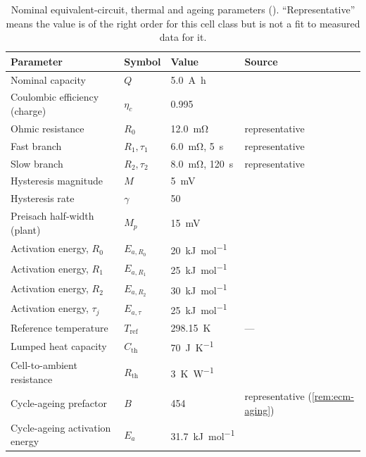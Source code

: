 \begin{table}[H]\centering
\caption{Nominal equivalent-circuit, thermal and ageing parameters
(). ``Representative'' means the value is of the right order for this
cell class but is not a fit to measured data for it.}
\label{tab:ecm-cellparams}
\small
\begin{tabular}{llll}\toprule
Parameter & Symbol & Value & Source \\ \midrule
Nominal capacity & $Q$ & \SI{5.0}{\ampere\hour} & \cite{chen2020parameterization}\\
Coulombic efficiency (charge) & $\eta_c$ & \num{0.995} & \cite{ng2009coulomb,smith2010coulombic}\\
Ohmic resistance & $R_0$ & \SI{12.0}{\milli\ohm} & representative\\
Fast branch & $R_1,\tau_1$ & \SI{6.0}{\milli\ohm}, \SI{5}{\second} & representative\\
Slow branch & $R_2,\tau_2$ & \SI{8.0}{\milli\ohm}, \SI{120}{\second} & representative\\
Hysteresis magnitude & $M$ & \SI{5}{\milli\volt} & \cite{plett2004ekf1,plett2015bms1}\\
Hysteresis rate & $\gamma$ & \num{50} & \cite{plett2015bms1}\\
Preisach half-width (plant) & $M_p$ & \SI{15}{\milli\volt} & \cite{baronti2014hysteresis}\\
Activation energy, $R_0$ & $E_{a,R_0}$ & \SI{20}{\kilo\joule\per\mole} & \cite{plett2015bms1,waag2013impedance}\\
Activation energy, $R_1$ & $E_{a,R_1}$ & \SI{25}{\kilo\joule\per\mole} & \cite{plett2015bms1}\\
Activation energy, $R_2$ & $E_{a,R_2}$ & \SI{30}{\kilo\joule\per\mole} & \cite{plett2015bms1}\\
Activation energy, $\tau_j$ & $E_{a,\tau}$ & \SI{25}{\kilo\joule\per\mole} & \cite{plett2015bms1}\\
Reference temperature & $T_{\mathrm{ref}}$ & \SI{298.15}{\kelvin} & ---\\
Lumped heat capacity & $C_{\mathrm{th}}$ & \SI{70}{\joule\per\kelvin} & \cite{lin2014thermal}\\
Cell-to-ambient resistance & $R_{\mathrm{th}}$ & \SI{3}{\kelvin\per\watt} & \cite{lin2014thermal}\\
Cycle-ageing prefactor & $B$ & \num{454} & representative (\cref{rem:ecm-aging})\\
Cycle-ageing activation energy & $E_a$ & \SI{31.7}{\kilo\joule\per\mole} & \cite{wang2011cyclelife}\\

\end{tabular}
\end{table}
